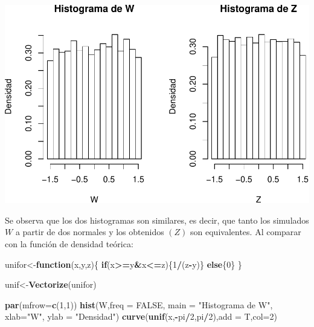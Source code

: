 \documentclass[]{article}
\newenvironment{Shaded}{\begin{snugshade}}{\end{snugshade}}
\newcommand{\KeywordTok}[1]{\textcolor[rgb]{0.13,0.29,0.53}{\textbf{#1}}}
\newcommand{\DataTypeTok}[1]{\textcolor[rgb]{0.13,0.29,0.53}{#1}}
\newcommand{\DecValTok}[1]{\textcolor[rgb]{0.00,0.00,0.81}{#1}}
\newcommand{\StringTok}[1]{\textcolor[rgb]{0.31,0.60,0.02}{#1}}
\newcommand{\OtherTok}[1]{\textcolor[rgb]{0.56,0.35,0.01}{#1}}
\newcommand{\ControlFlowTok}[1]{\textcolor[rgb]{0.13,0.29,0.53}{\textbf{#1}}}
\newcommand{\OperatorTok}[1]{\textcolor[rgb]{0.81,0.36,0.00}{\textbf{#1}}}
\newcommand{\NormalTok}[1]{#1}
\begin{document}
\includegraphics{notebook_simulaciones_files/figure-latex/unnamed-chunk-8-1.pdf}

Se observa que los dos histogramas son similares, es decir, que tanto
los simulados \(W\) a partir de dos normales y los obtenidos \((Z)\) son
equivalentes. Al comparar con la función de densidad teórica:

\begin{Shaded}
\begin{Highlighting}[]
\NormalTok{unifor<-}\ControlFlowTok{function}\NormalTok{(x,y,z)\{}
  \ControlFlowTok{if}\NormalTok{(x}\OperatorTok{>=}\NormalTok{y}\OperatorTok{&}\NormalTok{x}\OperatorTok{<=}\NormalTok{z)\{}\DecValTok{1}\OperatorTok{/}\NormalTok{(z}\OperatorTok{-}\NormalTok{y)\}}
  \ControlFlowTok{else}\NormalTok{\{}\DecValTok{0}\NormalTok{\}}
\NormalTok{\}}

\NormalTok{unif<-}\KeywordTok{Vectorize}\NormalTok{(unifor)}

\KeywordTok{par}\NormalTok{(}\DataTypeTok{mfrow=}\KeywordTok{c}\NormalTok{(}\DecValTok{1}\NormalTok{,}\DecValTok{1}\NormalTok{))}
\KeywordTok{hist}\NormalTok{(W,}\DataTypeTok{freq =} \OtherTok{FALSE}\NormalTok{, }\DataTypeTok{main =} \StringTok{"Histograma de W"}\NormalTok{, }\DataTypeTok{xlab=}\StringTok{"W"}\NormalTok{, }\DataTypeTok{ylab =} \StringTok{"Densidad"}\NormalTok{)}
\KeywordTok{curve}\NormalTok{(}\KeywordTok{unif}\NormalTok{(x,}\OperatorTok{-}\NormalTok{pi}\OperatorTok{/}\DecValTok{2}\NormalTok{,pi}\OperatorTok{/}\DecValTok{2}\NormalTok{),}\DataTypeTok{add =}\NormalTok{ T,}\DataTypeTok{col=}\DecValTok{2}\NormalTok{)}
\end{Highlighting}
\end{Shaded}
\end{document}
